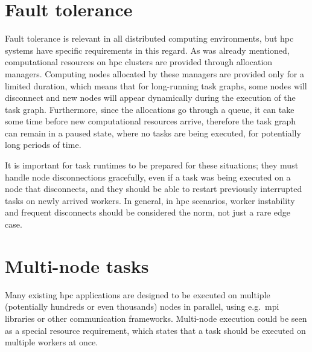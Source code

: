 \section{Fault tolerance}
Fault tolerance is relevant in all distributed computing environments, but
\gls{hpc} systems have specific requirements in this regard. As was already
mentioned, computational resources on \gls{hpc} clusters are provided through
allocation managers. Computing nodes allocated by these managers are provided only for a limited
duration, which means that for long-running task graphs, some nodes will disconnect and new nodes
will appear dynamically during the execution of the task graph. Furthermore, since the allocations
go through a queue, it can take some time before new computational resources arrive, therefore the
task graph can remain in a paused state, where no tasks are being executed, for potentially long
periods of time.

It is important for task runtimes to be prepared for these situations; they must handle node
disconnections gracefully, even if a task was being executed on a node that disconnects, and they
should be able to restart previously interrupted tasks on newly arrived workers. In general, in
\gls{hpc} scenarios, worker instability and frequent disconnects should be
considered the norm, not just a rare edge case.

\section{Multi-node tasks}
Many existing \gls{hpc} applications are designed to be executed on multiple
(potentially hundreds or even thousands) nodes in parallel, using e.g.\ \gls{mpi}
libraries or other communication frameworks. Multi-node execution could be seen as a special
resource requirement, which states that a task should be executed on multiple workers at once.


